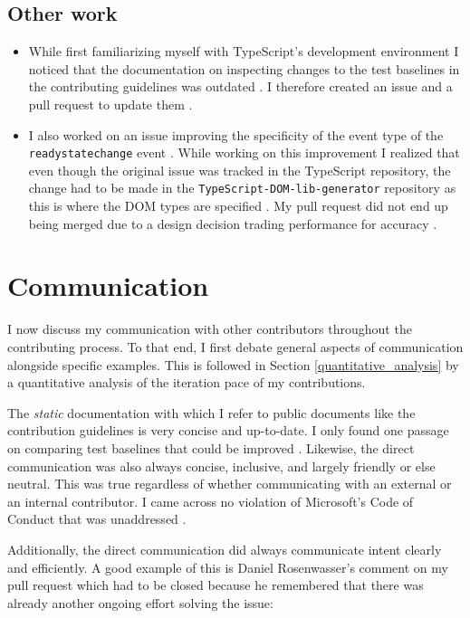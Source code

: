 \documentclass[12pt]{scrartcl}
\def\code#1{\texttt{\frenchspacing#1}}
\let\oldsection\section
\renewcommand\section{\clearpage\oldsection}
\begin{document}
\subsection{Other work}

\begin{itemize}
    \item While first familiarizing myself with TypeScript's development environment I noticed that the documentation on inspecting changes to the test baselines in the contributing guidelines was outdated \cite{ContributingGuidelines}. I therefore created an issue and a pull request to update them \cite{41991}\cite{42031}.
    \item I also worked on an issue improving the specificity of the event type of the \code{readystatechange} event \cite{41775}. While working on this improvement I realized that even though the original issue was tracked in the TypeScript repository, the change had to be made in the \code{TypeScript-DOM-lib-generator} repository as this is where the DOM types are specified \cite{DOMLibGenerator}. My pull request did not end up being merged due to a design decision trading performance for accuracy \cite{969Comment}.
\end{itemize}

\section{Communication}

I now discuss my communication with other contributors throughout the contributing process. To that end, I first debate general aspects of communication alongside specific examples. This is followed in Section \ref{quantitative_analysis} by a quantitative analysis of the iteration pace of my contributions.

The \textit{static} documentation with which I refer to public documents like the contribution guidelines is very concise and up-to-date. I only found one passage on comparing test baselines that could be improved \cite{41991}. Likewise, the direct communication was also always concise, inclusive, and largely friendly or else neutral. This was true regardless of whether communicating with an external or an internal contributor. I came across no violation of Microsoft's Code of Conduct that was unaddressed \cite{MicrosoftCodeOfConduct}.

Additionally, the direct communication did always communicate intent clearly and efficiently. A good example of this is Daniel Rosenwasser's comment on my pull request which had to be closed because he remembered that there was already another ongoing effort solving the issue:
\end{document}
